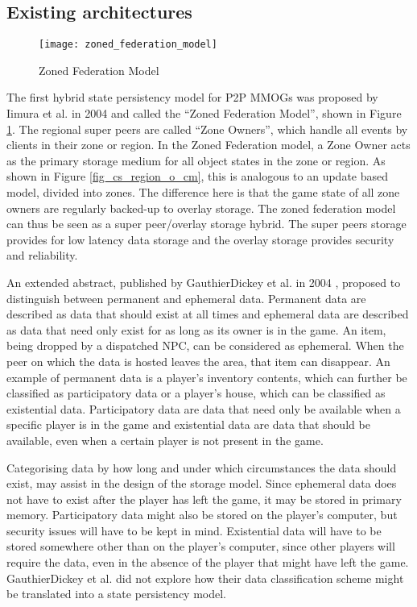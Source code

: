 \subsection{Existing architectures}

\begin{figure}[htbp]
 \centering
 \texttt{[image: zoned\_federation\_model]}
 \caption{Zoned Federation Model \cite{zoned_federation}}
 \label{fig_zoned_federation_model}
\end{figure}
%
The first hybrid state persistency model for P2P MMOGs was proposed by Iimura et al. in 2004 \cite{zoned_federation} and called the ``Zoned
Federation Model'', shown in Figure \ref{fig_zoned_federation_model}. The regional super peers are called ``Zone Owners'', which handle all events by
clients in their zone or region. In the Zoned Federation model, a Zone Owner acts as the primary storage medium for all object states in the zone or
region. As shown in Figure \ref{fig_cs_region_o_cm}, this is analogous to an update based model, divided into zones. The difference here is that the
game state of all zone owners are regularly backed-up to overlay storage. The zoned federation model can thus be seen as a super peer/overlay storage
hybrid. The super peers storage provides for low latency data storage and the overlay storage provides security and reliability.

An extended abstract, published by GauthierDickey et al. in 2004 \cite{hybrid_storage1}, proposed to distinguish between permanent and ephemeral
data. Permanent data are described as data that should exist at all times and ephemeral data are described as data that need only exist for as long
as its owner is in the game. An item, being dropped by a dispatched NPC, can be considered as ephemeral. When the peer on which the data is hosted
leaves the area, that item can disappear. An example of permanent data is a player's inventory contents, which can further be classified as
participatory data or a player's house, which can be classified as existential data. Participatory data are data that need only be available when a
specific player is in the game and existential data are data that should be available, even when a certain player is not present in the game.

Categorising data by how long and under which circumstances the data should exist, may assist in the design of the storage model. Since ephemeral
data does not have to exist after the player has left the game, it may be stored in primary memory. Participatory data might also be stored on the
player's computer, but security issues will have to be kept in mind. Existential data will have to be stored somewhere other than on the player's
computer, since other players will require the data, even in the absence of the player that might have left the game. GauthierDickey et al. did not
explore how their data classification scheme might be translated into a state persistency model.

